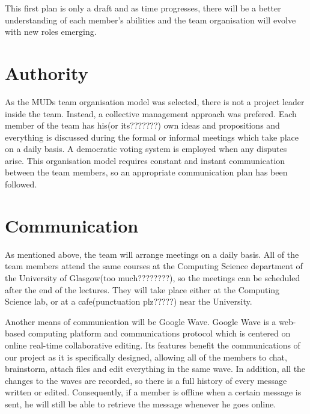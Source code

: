 \documentclass{article}
\begin{document}
This first plan is only a draft and as time progresses, there will be a better understanding of each member's abilities and the team organisation will evolve with new roles emerging. 


\section{Authority}
\label{auth}

As the MUDs team organisation model was selected, there is not a project leader inside the team. Instead, a collective management approach was prefered. Each member of the team has his(or its???????) own ideas and propositions and everything is discussed during the formal or informal meetings which take place on a daily basis. A democratic voting system is employed when any disputes arise. This organisation model requires constant and instant communication between the team members, so an appropriate communication plan has been followed.


\section{Communication}
\label{info}

As mentioned above, the team will arrange meetings on a daily basis. All of the team members attend the same courses at the Computing Science department of the University of Glasgow(too much????????), so the meetings can be scheduled after the end of the lectures. They will take place either at the Computing Science lab, or at a cafe(punctuation plz?????) near the University.

Another means of communication will be Google Wave. Google Wave is a web-based computing platform and communications protocol which is centered on online real-time collaborative editing. Its features benefit the communications of our project as it is specifically designed, allowing all of the members to chat, brainstorm, attach files and edit everything in the same wave. In addition, all the changes to the waves are recorded, so there is a full history of every message written or edited. Consequently, if a member is offline when a certain message is sent, he will still be able to retrieve the message whenever he goes online.
\end{document}
